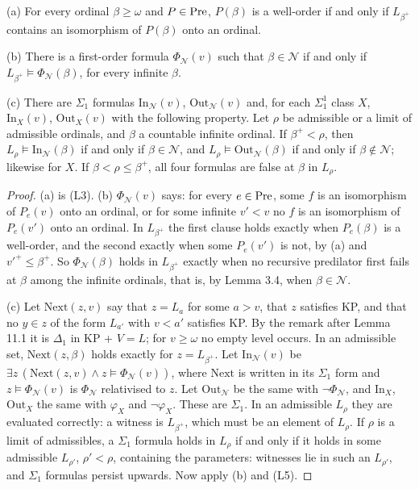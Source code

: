 \documentclass[11pt]{article}
\begin{document}
\begin{statement} (a) For every ordinal $\beta \ge \omega$ and $P \in \mathrm{Pre}$, $P(\beta)$ is a
well-order if and only if $L_{\beta^+}$ contains an isomorphism of $P(\beta)$ onto an ordinal.

(b) There is a first-order formula $\Phi_{\mathcal N}(v)$ such that $\beta \in \mathcal N$ if and only if
$L_{\beta^+} \models \Phi_{\mathcal N}(\beta)$, for every infinite $\beta$.

(c) There are $\Sigma_1$ formulas $\mathrm{In}_{\mathcal N}(v)$, $\mathrm{Out}_{\mathcal N}(v)$ and, for each
$\Sigma^1_1$ class $X$, $\mathrm{In}_X(v)$, $\mathrm{Out}_X(v)$ with the following property. Let $\rho$ be
admissible or a limit of admissible ordinals, and $\beta$ a countable infinite ordinal. If $\beta^+ < \rho$, then
$L_{\rho} \models \mathrm{In}_{\mathcal N}(\beta)$ if and only if $\beta \in \mathcal N$, and
$L_{\rho} \models \mathrm{Out}_{\mathcal N}(\beta)$ if and only if $\beta \notin \mathcal N$; likewise for $X$. If
$\beta < \rho \le \beta^+$, all four formulas are false at $\beta$ in $L_{\rho}$.
\end{statement}

\begin{proof} (a) is (L3). (b) $\Phi_{\mathcal N}(v)$ says: for every $e \in \mathrm{Pre}$, some $f$ is an isomorphism of
$P_e(v)$ onto an ordinal, or for some infinite $v' < v$ no $f$ is an isomorphism of $P_e(v')$ onto an ordinal.
In $L_{\beta^+}$ the first clause holds exactly when $P_e(\beta)$ is a well-order, and the second exactly when
some $P_e(v')$ is not, by (a) and $v'^+ \le \beta^+$. So $\Phi_{\mathcal N}(\beta)$ holds in $L_{\beta^+}$ exactly
when no recursive predilator first fails at $\beta$ among the infinite ordinals, that is, by Lemma 3.4, when
$\beta \in \mathcal N$.

(c) Let $\mathrm{Next}(z, v)$ say that $z = L_a$ for some $a > v$, that $z$ satisfies KP, and that no $y \in z$
of the form $L_{a'}$ with $v < a'$ satisfies KP. By the remark after Lemma 11.1 it is $\Delta_1$ in KP + $V = L$;
for $v \ge \omega$ no empty level occurs. In an admissible set, $\mathrm{Next}(z, \beta)$ holds exactly for
$z = L_{\beta^+}$. Let $\mathrm{In}_{\mathcal N}(v)$ be
$\exists z\, (\mathrm{Next}(z, v) \wedge z \models \Phi_{\mathcal N}(v))$, where $\mathrm{Next}$ is written in its
$\Sigma_1$ form and $z \models \Phi_{\mathcal N}(v)$ is $\Phi_{\mathcal N}$ relativised to $z$. Let
$\mathrm{Out}_{\mathcal N}$ be the same with $\neg\Phi_{\mathcal N}$, and $\mathrm{In}_X$, $\mathrm{Out}_X$ the same
with $\varphi_X$ and $\neg\varphi_X$. These are $\Sigma_1$. In an admissible $L_{\rho}$ they are evaluated
correctly: a witness is $L_{\beta^+}$, which must be an element of $L_{\rho}$. If $\rho$ is a limit of
admissibles, a $\Sigma_1$ formula holds in $L_{\rho}$ if and only if it holds in some admissible $L_{\rho'}$,
$\rho' < \rho$, containing the parameters: witnesses lie in such an $L_{\rho'}$, and $\Sigma_1$ formulas persist
upwards. Now apply (b) and (L5).
\end{proof}
\end{document}
